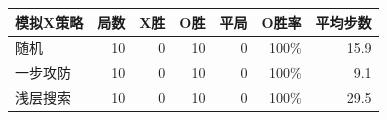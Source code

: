 \begin{tabular}{lrrrrrr}
\toprule
模拟X策略 & 局数 & X胜 & O胜 & 平局 & O胜率 & 平均步数 \\
\midrule
随机 & 10 & 0 & 10 & 0 & 100\% & 15.9 \\
一步攻防 & 10 & 0 & 10 & 0 & 100\% & 9.1 \\
浅层搜索 & 10 & 0 & 10 & 0 & 100\% & 29.5 \\
\bottomrule
\end{tabular}
